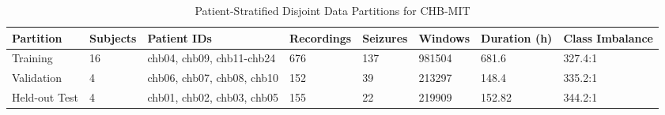 \begin{table}[t]
\centering
\caption{Patient-Stratified Disjoint Data Partitions for CHB-MIT}
\label{tab:cohort_partition}
\small
\begin{tabular}{llllllll}
\toprule
Partition & Subjects & Patient IDs & Recordings & Seizures & Windows & Duration (h) & Class Imbalance \\
\midrule
Training & 16 & chb04, chb09, chb11-chb24 & 676 & 137 & 981504 & 681.6 & 327.4:1 \\
Validation & 4 & chb06, chb07, chb08, chb10 & 152 & 39 & 213297 & 148.4 & 335.2:1 \\
Held-out Test & 4 & chb01, chb02, chb03, chb05 & 155 & 22 & 219909 & 152.82 & 344.2:1 \\
\bottomrule
\end{tabular}
\end{table}
